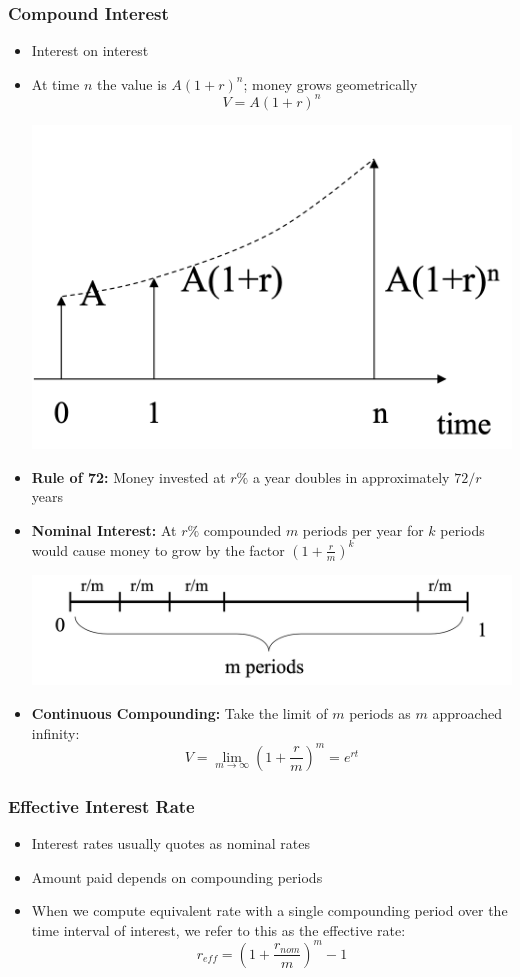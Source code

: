 \documentclass[11pt]{article}
\begin{document}
\subsubsection{Compound Interest}
\begin{itemize}
\item Interest on interest
\item At time $n$ the value is $A(1+r)^n$; money grows geometrically
$$ V = A(1+r)^n$$
\begin{center}
\includegraphics[scale=0.4]{images/compound.png} 
\end{center}
\item \textbf{Rule of 72:} Money invested at $r \%$ a year doubles in approximately $72/r$ years
\item \textbf{Nominal Interest:} At $r\%$ compounded $m$ periods per year for $k$ periods would cause money to grow by the factor $(1+ \frac{r}{m})^k$
\begin{center}
\includegraphics[scale=0.3]{images/nominal.png} 
\end{center}
\item \textbf{Continuous Compounding:} Take the limit of $m$ periods as $m$ approached infinity:
$$V =  \lim_{m \rightarrow \infty} \left(1 +\frac{r}{m} \right)^m = e^{rt}$$
\end{itemize}

\subsubsection{Effective Interest Rate}
\begin{itemize}
\item Interest rates usually quotes as nominal rates
\item Amount paid depends on compounding periods
\item When we compute equivalent rate with a single compounding period over the time interval of interest, we refer to this as the effective rate:
$$ r_{eff} = \left( 1 + \frac{r_{nom}}{m} \right) ^ m -1 $$
\end{itemize}
\end{document}
